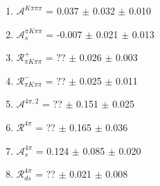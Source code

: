 \begin{enumerate}
\item $\mathcal{A}^{K\pi\pi\pi}$ = 0.037 $\pm$ 0.032 $\pm$ 0.010
\item $\mathcal{A}_s^{\pi K\pi\pi}$ = -0.007 $\pm$ 0.021 $\pm$ 0.013
\item $\mathcal{R}_{\pi K\pi\pi}^+$ = ?? $\pm$ 0.026 $\pm$ 0.003
\item $\mathcal{R}_{\pi K\pi\pi}^-$ = ?? $\pm$ 0.025 $\pm$ 0.011
\item $\mathcal{A}^{4\pi,2}$ = ?? $\pm$ 0.151 $\pm$ 0.025
\item $\mathcal{R}^{4\pi}$ = ?? $\pm$ 0.165 $\pm$ 0.036
\item $\mathcal{A}_s^{4\pi}$ = 0.124 $\pm$ 0.085 $\pm$ 0.020
\item $\mathcal{R}_{ds}^{4\pi}$ = ?? $\pm$ 0.021 $\pm$ 0.008
\end{enumerate}
